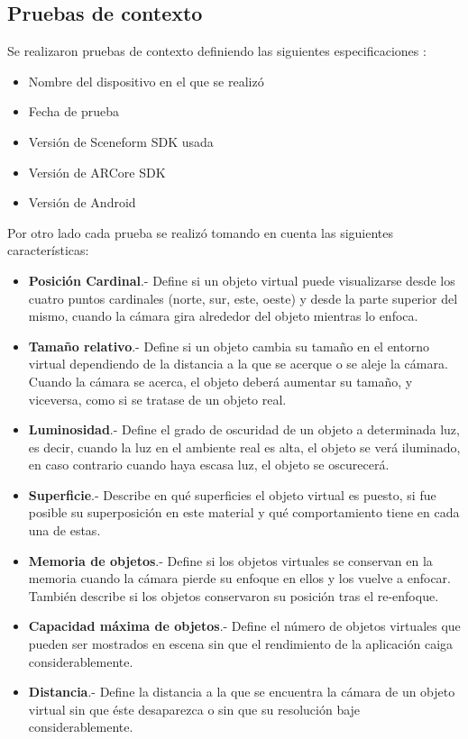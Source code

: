 \subsection{Pruebas de contexto}
Se realizaron pruebas de contexto definiendo las siguientes especificaciones 	:
\begin{itemize}
	\item Nombre del dispositivo en el que se realizó
	\item Fecha de prueba
	\item Versión de Sceneform SDK usada
	\item Versión de ARCore SDK
	\item Versión de Android
\end{itemize}
Por otro lado cada prueba se realizó tomando en cuenta las siguientes características:
\begin{itemize}
	\item \textbf{Posición Cardinal}.- Define si un objeto virtual puede visualizarse desde los cuatro puntos cardinales (norte, sur, este, oeste) y desde la parte superior del mismo, cuando la cámara gira alrededor del objeto mientras lo enfoca.
	\item \textbf{Tamaño relativo}.- Define si un objeto cambia su tamaño en el entorno virtual dependiendo de la distancia a la que se acerque o se aleje la cámara. Cuando la cámara se acerca, el objeto deberá aumentar su tamaño, y viceversa, como si se tratase de un objeto real.
	\item \textbf{Luminosidad}.- Define el grado de oscuridad de un objeto a determinada luz, es decir, cuando la luz en el ambiente real es alta, el objeto se verá iluminado, en caso contrario cuando haya escasa luz, el objeto se oscurecerá.
	\item \textbf{Superficie}.- Describe en qué superficies el objeto virtual es puesto, si fue posible su superposición en este material y qué comportamiento tiene en cada una de estas.
	\item \textbf{Memoria de objetos}.- Define si los objetos virtuales se conservan en la memoria cuando la cámara pierde su enfoque en ellos y los vuelve a enfocar. También describe si los objetos conservaron su posición tras el re-enfoque.
	\item \textbf{Capacidad máxima de objetos}.- Define el número de objetos virtuales que pueden ser mostrados en escena sin que el rendimiento de la aplicación caiga considerablemente.
	\item \textbf{Distancia}.- Define la distancia a la que se encuentra la cámara de un objeto virtual sin que éste desaparezca o sin que su resolución baje considerablemente.
\end{itemize}
\noindent




